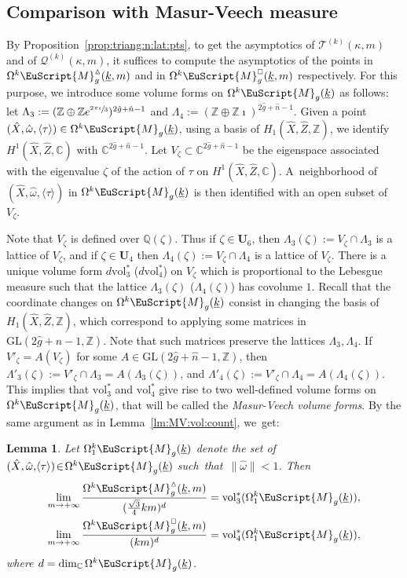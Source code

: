 \documentclass[JEP,XML,SOM,Unicode]{cedram}
\let\mathcal\EuScript
\theoremstyle{plain}
\newtheorem{Lemma}[Theorem]{Lemma}
\theoremstyle{definition}
\def\C{\mathbb{C}}
\newcommand\Z{\mathbb{Z}}
\newcommand{\Q}{\mathbb{Q}}
\newcommand{\Ub}{\mathbf{U}}
\newcommand{\Mcal}{\mathcal{M}}
\newcommand{\QQ}{\mathscr{Q}}
\newcommand{\TT}{\mathscr{T}}
\newcommand{\GL}{\mathrm{GL}}
\newcommand{\vol}{\mathrm{vol}}
\newcommand{\hg}{\hat{g}}
\newcommand{\hn}{\hat{n}}
\newcommand{\hX}{\hat{X}}
\newcommand{\hZ}{\hat{Z}}
\newcommand{\homg}{\hat{\omega}}
\let\ul\underline
\newcommand{\Skdiff}{\Omega^k\mathcal{M}_{g}(\ul{k})}
\newcommand{\Skdiffi}{\Omega^k_1\mathcal{M}_{g}(\ul{k})}
\newcommand{\Tkdiffm}{\Omega^k\Mcal^\vartriangle_g(\ul{k},m)}
\newcommand{\Qkdiffm}{\Omega^k\Mcal^{\scriptscriptstyle\square}_g(\ul{k},m)}
\begin{document}
\subsection{Comparison with Masur-Veech measure}\label{sec:compare:MV:vol}
By Proposition~\ref{prop:triang:n:lat:pts}, to get the asymptotics of $\TT^{(k)}(\kappa,m)$ and of $\QQ^{(k)}(\kappa,m)$, it suffices to compute the asymptotics of the points in $\Tkdiffm$ and in $\Qkdiffm$ respectively. For this purpose, we introduce some volume forms on $\Skdiff$ as follows: let $\Lambda_3:=(\Z\oplus\Z e^{\sfrac{2\pi\imath}{3}})^{2\hg+\hn-1}$ and $\Lambda_4:=(\Z\oplus\Z\imath)^{2\hg+\hn-1}$.
Given a point $(\hX,\homg,\langle\tau\rangle) \in \Skdiff$, using a basis of $H_1(\hX,\hZ,\Z)$, we identify $H^1(\hX,\hZ,\C)$ with $\C^{2\hg+\hn-1}$.
Let $V_\zeta \subset \C^{2\hg+\hn-1}$ be the eigenspace associated with the eigenvalue $\zeta$ of the action of $\tau$ on $H^1(\hX,\hZ,\C)$.
A~neighborhood of $(\hX,\homg,\langle\tau\rangle)$ in $\Skdiff$ is then identified with an open subset of~$V_\zeta$.

Note that $V_\zeta$ is defined over $\Q(\zeta)$. Thus if $\zeta \in \Ub_6$, then $\Lambda_3(\zeta):=V_\zeta\cap\Lambda_3$ is a lattice of $V_\zeta$, and if $\zeta\in \Ub_4$ then $\Lambda_4(\zeta):=V_\zeta\cap\Lambda_4$ is a lattice of $V_\zeta$.
There is a unique volume form $d\vol_3^*$ (\resp $d\vol_4^*$) on $V_\zeta$ which is proportional to the Lebesgue measure such that the lattice $\Lambda_3(\zeta)$ (\resp $\Lambda_4(\zeta)$) has covolume $1$.
Recall that the coordinate changes on $\Skdiff$ consist in changing the basis of $H_1(\hX,\hZ,\Z)$, which correspond to applying some matrices in $\GL(2\hg+\hn-1,\Z)$. Note that such matrices preserve the lattices $\Lambda_3,\Lambda_4$. If $V'_\zeta=A(V_\zeta)$ for some $A\in \GL(2\hg+\hn-1,\Z)$, then $\Lambda'_3(\zeta):=V'_\zeta\cap\Lambda_3=A(\Lambda_3(\zeta))$, and $\Lambda'_4(\zeta):=V'_\zeta\cap\Lambda_4=A(\Lambda_4(\zeta))$.
This implies that $\vol_3^*$ and $\vol_4^*$ give rise to two well-defined volume forms on $\Skdiff$, that will be called the \emph{Masur-Veech volume forms}. By the same argument as in Lemma~\ref{lm:MV:vol:count}, we~get:
\begin{Lemma}\label{lm:MV:asymp:triang} Let $\Skdiffi$ denote the set of $(\hX,\homg,\!\langle\tau\rangle)\!\in\!\Skdiff$ such~that~\hbox{$\|\homg\| \!<\!1$}. Then
\begin{align}
\label{eqn:asymp:n:vol:tria} \lim_{m\to +\infty}\frac{\Tkdiffm}{(\frac{\sqrt{3}}{4}km)^d} & = \vol_3^*(\Skdiffi), \\
\label{eq:asymp:n:vol:quad} \lim_{m\to +\infty}\frac{\Qkdiffm}{(km)^d} & = \vol_4^*(\Skdiffi),
\end{align}
where $d=\dim_\C\Skdiff$.
\end{Lemma}
\end{document}
